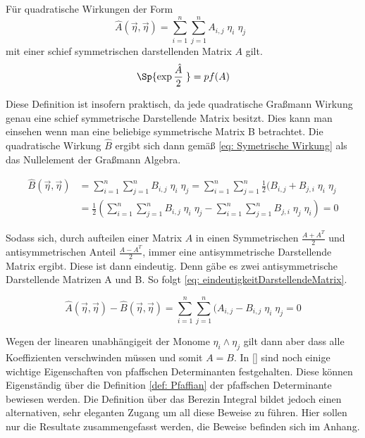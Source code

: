 \begin{grayframe}[frametitle = {Spur von quadratischen Graßmann Wirkungen}]
Für quadratische Wirkungen der Form 
    \begin{equation} \label{eq: Graßmann Transformationsformel}
        \hat{A}\left(\vec{\eta}, \vec{\eta}\right) = \sum_{i=1}^n \sum_{j=1}^n A_{i,j}\; \eta_i\; \eta_j  \;\;
    \end{equation}
mit einer schief symmetrischen darstellenden Matrix $A$ gilt.
    \begin{equation} \label{eq: Graßmann Transformationsformel}
        \Sp{\exp{\frac{\hat{A}}{2}\;}} = pf(A) 
    \end{equation}
\end{grayframe}

\noindent Diese Definition ist insofern praktisch, da jede quadratische Graßmann Wirkung genau eine schief symmetrische Darstellende Matrix besitzt. Dies kann man einsehen wenn man eine beliebige symmetrische Matrix B betrachtet.
Die quadratische Wirkung $\hat{B}$ ergibt sich dann gemäß \eqref{eq: Symetrische Wirkung} als das Nullelement der Graßmann Algebra. 

\begin{align}
\hat{B}\left(\vec{\eta}, \vec{\eta}\right) 
    & = \sum_{i=1}^n \sum_{j=1}^n B_{i,j}\; \eta_i\; \eta_j = \sum_{i=1}^n \sum_{j=1}^n \frac{1}{2} (B_{i,j} + B_{j,i}\; \eta_i\; \eta_j \nonumber \\
    & =  \frac{1}{2}\left( \sum_{i=1}^n \sum_{j=1}^n B_{i,j}\; \eta_i\; \eta_j - \sum_{i=1}^n \sum_{j=1}^n B_{j,i}\; \eta_j\; \eta_i\right)  = 0 \label{eq: Symetrische Wirkung}
\end{align}

\noindent Sodass sich, durch aufteilen einer Matrix $A$ in einen Symmetrischen $\frac{A+A^T}{2}$ und antisymmetrischen Anteil $\frac{A-A^T}{2}$, immer eine antisymmetrische Darstellende Matrix ergibt. Diese ist dann eindeutig. Denn gäbe es zwei antisymmetrische Darstellende Matrizen A und B. So folgt  \eqref{eq: eindeutigkeitDarstellendeMatrix}.

\begin{equation} \label{eq: eindeutigkeitDarstellendeMatrix}
\hat{A}\left(\vec{\eta}, \vec{\eta}\right)  - \hat{B}\left(\vec{\eta}, \vec{\eta}\right)  = \sum_{i=1}^n \sum_{j=1}^n (A_{i,j} - B_{i,j}\; \eta_i\; \eta_j = 0
\end{equation}

\noindent Wegen der linearen unabhängigeit der Monome $\eta_i\wedge \eta_j$ gilt dann aber dass alle Koeffizienten verschwinden müssen und somit $A=B$. 
In \eqref{} sind noch einige wichtige Eigenschaften von pfaffschen Determinanten festgehalten. Diese können Eigenständig über die Definition \eqref{def: Pfaffian} der pfaffschen Determinante bewiesen werden. Die Definition über das Berezin Integral bildet jedoch einen alternativen, sehr eleganten Zugang um all diese Beweise zu führen. Hier sollen nur die Resultate zusammengefasst werden, die Beweise befinden sich im Anhang.


